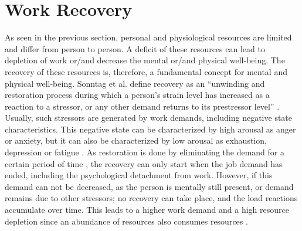 \documentclass{hasel_thesis}
\begin{document}
 \section{Work Recovery}

As seen in the previous section, personal and physiological resources are limited and differ from person to person. A deficit of these resources can lead to depletion of work or/and decrease the mental or/and physical well-being. The recovery of these resources is, therefore, a fundamental concept for mental and physical well-being. Sonntag et al. define recovery as an “unwinding and restoration process during which a person’s strain level has increased as a reaction to a stressor, or any other demand returns to its prestressor level” \cite[p.366]{Sonnentag.2017}. Usually, such stressors are generated by work demands, including negative state characteristics. This negative state can be characterized by high arousal as anger or anxiety, but it can also be characterized by low arousal as exhaustion, depression or fatigue \cite{Sonnentag.2022}. As restoration is done by eliminating the demand for a certain period of time \cite{Trougakos.2009}, the recovery can only start when the job demand has ended, including the psychological detachment from work. 
However, if this demand can not be decreased, as the person is mentally still present, or demand remains due to other stressors; no recovery can take place, and the load reactions accumulate over time. This leads to a higher work demand and a high resource depletion since an abundance of resources also consumes resources \cite{Trougakos.2009}.
\end{document}
